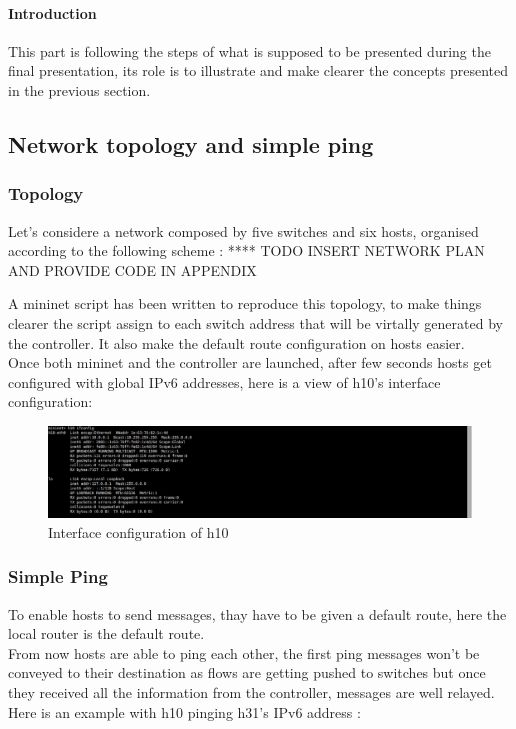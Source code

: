 \documentclass{article}
\begin{document}
\paragraph{Introduction}
This part is following the steps of what is supposed to be presented
during the final presentation, its role is to illustrate and make
clearer the concepts presented in the previous section.

\subsection{Network topology and simple ping}

\subsubsection{Topology}
Let's considere a network composed by five switches and six hosts,
organised according to the following scheme : 
**** TODO INSERT NETWORK PLAN AND PROVIDE CODE IN APPENDIX

A mininet script has been written to reproduce this topology, to make
things clearer the script assign to each switch address that will be
virtally generated by the controller. It also make the default route
configuration on hosts easier.\\
\newline
Once both mininet and the controller are launched, after few seconds
hosts get configured with global IPv6 addresses, here is a view of
h10's interface configuration:

\begin{figure}[h!]
  \centering
    \includegraphics[trim = 0mm 0mm 237mm 0mm,clip,scale=0.5]{reportPictures/h10_autoconfiguration.png}
  \caption{Interface configuration of h10}
\end{figure}


\subsubsection{Simple Ping}
To enable hosts to send messages, thay have to be given a default
route, here the local router is the default route.\\
\newline
From now hosts are able to ping each other, the first ping messages
won't be conveyed to their destination as flows are getting pushed
to switches but once they received all the information from the
controller, messages are well relayed. Here is an example with h10
pinging h31's IPv6 address : 
\end{document}
